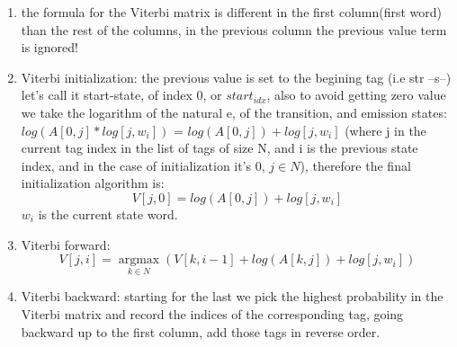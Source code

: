 \documentclass[4apaper,12pt]{book}
\begin{document}
\begin{description}
\begin{enumerate}
    \item the formula for the Viterbi matrix is different in the first column(first word) than the rest of the columns, in the previous column the previous value term is ignored!

    \item Viterbi initialization: the previous value is set to the begining tag (i.e str --s--) let's call it start-state, of index 0, or $start_{idx}$, also to avoid getting zero value we take the logarithm of the natural e, of the transition, and emission states: $log(A[0,j]*log[j,w_i])$ = $log(A[0,j]) + log[j,w_i]$ (where j in the current tag index in the list of tags of size N, and i is the previous state index, and in the case of initialization it's 0,  $j \in N$), therefore the final initialization algorithm is:  $$V[j,0] = log(A[0,j]) + log[j,w_i]$$ $w_i$ is the current state word.

    \item Viterbi forward: $$V[j,i] = \underset{k \in N}{\operatorname{argmax}}(V[k, i-1] + log(A[k,j]) + log[j,w_i])$$

    \item Viterbi backward: starting for the last we pick the highest probability in the Viterbi matrix and record the indices of the corresponding tag, going backward up to the first column, add those tags in reverse order.

    \end{enumerate}


\end{description}

\citep{xyz2}


\end{document}
